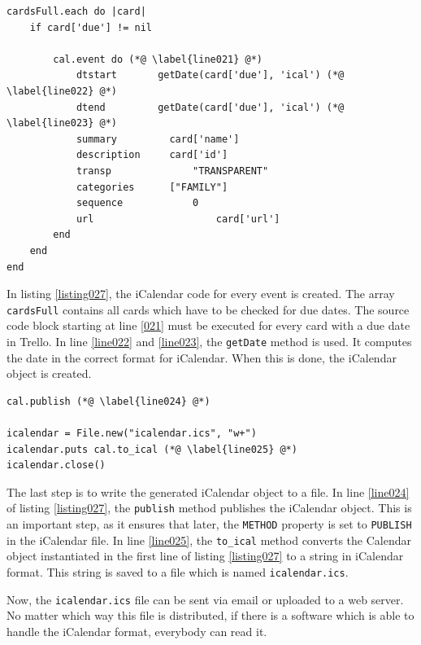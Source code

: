 \begin{lstlisting}[aboveskip=1\baselineskip, style=bash, caption=Generating the \lstinline{VEVENT} object., label=listing027]
cardsFull.each do |card|
	if card['due'] != nil	
		
		cal.event do (*@ \label{line021} @*)
			dtstart       getDate(card['due'], 'ical') (*@ \label{line022} @*)
			dtend         getDate(card['due'], 'ical') (*@ \label{line023} @*)
			summary     	card['name']
			description 	card['id']
			transp				"TRANSPARENT"
			categories		["FAMILY"]
			sequence			0
			url						card['url']
		end		
	end
end
\end{lstlisting}

In listing \ref{listing027}, the iCalendar code for every event is created. The array \lstinline{cardsFull} contains all cards which have to be checked for due dates. The source code block starting at line \ref{021} must be executed for every card with a due date in Trello. In line \ref{line022} and \ref{line023}, the \lstinline{getDate} method is used. It computes the date in the correct format for iCalendar. When this is done, the iCalendar object is created. 

\begin{lstlisting}[aboveskip=1\baselineskip, style=bash, caption=Saving the iCalendar file., label=listing027]
cal.publish (*@ \label{line024} @*)

icalendar = File.new("icalendar.ics", "w+")
icalendar.puts cal.to_ical (*@ \label{line025} @*)
icalendar.close()
\end{lstlisting}

The last step is to write the generated iCalendar object to a file. In line \ref{line024} of listing \ref{listing027}, the \lstinline{publish} method publishes the iCalendar object. This is an important step, as it ensures that later, the \lstinline{METHOD} property is set to \lstinline{PUBLISH} in the iCalendar file. In line \ref{line025}, the \lstinline{to_ical} method converts the Calendar object instantiated in the first line of listing \ref{listing027} to a string in iCalendar format. This string is saved to a file which is named \lstinline{icalendar.ics}. \cite{ical:gemdocu}

Now, the \lstinline{icalendar.ics} file can be sent via email or uploaded to a web server. No matter which way this file is distributed, if there is a software which is able to handle the iCalendar format, everybody can read it.

